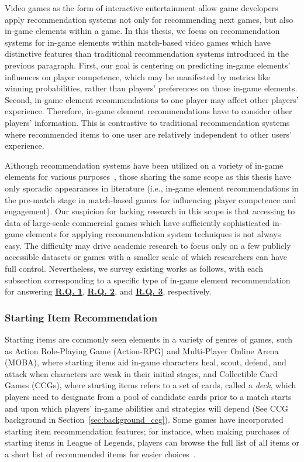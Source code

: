 Video games as the form of interactive entertainment allow game developers apply recommendation systems not only for recommending next games, but also in-game elements within a game. In this thesis, we focus on recommendation systems for in-game elements within match-based video games which have distinctive features than traditional recommendation systems introduced in the previous paragraph. First, our goal is centering on predicting in-game elements' influences on player competence, which may be manifested by metrics like winning probabilities, rather than players' preferences on those in-game elements. Second, in-game element recommendations to one player may affect other players' experience. Therefore, in-game element recommendations have to consider other players' information. This is contrastive to traditional recommendation systems where recommended items to one user are relatively independent to other users' experience.

Although recommendation systems have been utilized on a variety of in-game elements for various purposes~\cite{kolen2018horizontal,wu2017recommendation}, those sharing the same scope as this thesis have only sporadic appearances in literature (i.e., in-game element recommendations in the pre-match stage in match-based games for influencing player competence and engagement). 
Our suspicion for lacking research in this scope is that accessing to data of large-scale commercial games which have sufficiently sophisticated in-game elements for applying recommendation system techniques is not always easy. The difficulty may drive academic research to focus only on a few publicly accessible datasets or games with a smaller scale of which researchers can have full control. Nevertheless, we survey existing works as follows, with each subsection corresponding to a specific type of in-game element recommendation for answering  \hyperref[rq1]{\textbf{R.Q. 1}},  \hyperref[rq2]{\textbf{R.Q. 2}}, and  \hyperref[rq3]{\textbf{R.Q. 3}}, respectively.


\subsubsection{Starting Item Recommendation}
Starting items are commonly seen elements in a variety of genres of games, such as Action Role-Playing Game (Action-RPG) and Multi-Player Online Arena (MOBA), where starting items aid in-game characters heal, scout, defend, and attack when characters are weak in their initial stages, and Collectible Card Games (CCGs), where starting items refers to a set of cards, called a \textit{deck}, which players need to designate from a pool of candidate cards prior to a match starts and upon which players' in-game abilities and strategies will depend (See CCG background in  Section~\ref{sec:background_ccg}). Some games have incorporated starting item recommendation features; for instance, when making purchases of starting items in League of Legends, players can browse the full list of all items or a short list of recommended items for easier choices~\cite{lol_recomitem}. 

